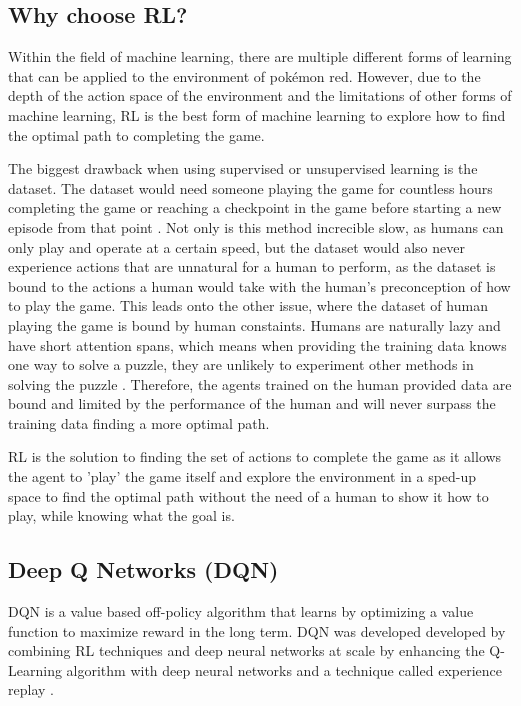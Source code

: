 \subsection{Why choose RL?}

Within the field of machine learning, there are multiple different forms of learning that can be applied to the environment of pokémon red. However, due to the depth of the action space of the environment and the limitations of other forms of machine learning, RL is the best form of machine learning to explore how to find the optimal path to completing the game. 

The biggest drawback when using supervised or unsupervised learning is the dataset. The dataset would need someone playing the game for countless hours completing the game or reaching a checkpoint in the game before starting a new episode from that point \cite{XanderSteenbrugge2019intro}. Not only is this method increcible slow, as humans can only play and operate at a certain speed, but the dataset would also never experience actions that are unnatural for a human to perform, as the dataset is bound to the actions a human would take with the human's preconception of how to play the game. This leads onto the other issue, where the dataset of human playing the game is bound by human constaints. Humans are naturally lazy and have short attention spans, which means when providing the training data knows one way to solve a puzzle, they are unlikely to experiment other methods in solving the puzzle \cite{XanderSteenbrugge2019intro}. Therefore, the agents trained on the human provided data are bound and limited by the performance of the human and will never surpass the training data finding a more optimal path. 

RL is the solution to finding the set of actions to complete the game as it allows the agent to 'play' the game itself and explore the environment in a sped-up space to find the optimal path without the need of a human to show it how to play, while knowing what the goal is. 

\subsection{Deep Q Networks (DQN)}

DQN is a value based off-policy algorithm that learns by optimizing a value function to maximize reward in the long term. DQN was developed developed by combining RL techniques and deep neural networks at scale by enhancing the Q-Learning algorithm with deep neural networks and a technique called experience replay \cite{TFAgentsAuthors2023}.

